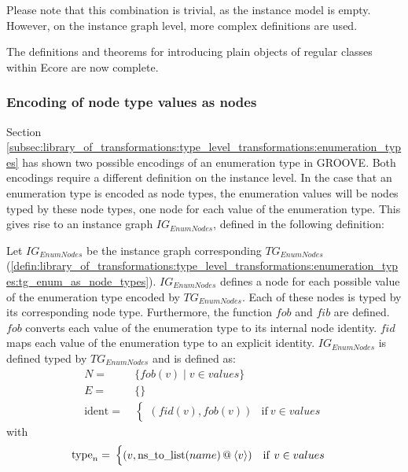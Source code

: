 Please note that this combination is trivial, as the instance model is empty. However, on the instance graph level, more complex definitions are used.

The definitions and theorems for introducing plain objects of regular classes within Ecore are now complete. 

\subsubsection{Encoding of node type values as nodes}

Section \cref{subsec:library_of_transformations:type_level_transformations:enumeration_types} has shown two possible encodings of an enumeration type in GROOVE. Both encodings require a different definition on the instance level. In the case that an enumeration type is encoded as node types, the enumeration values will be nodes typed by these node types, one node for each value of the enumeration type. This gives rise to an instance graph $IG_{EnumNodes}$, defined in the following definition:

\begin{defin}
\label{defin:library_of_transformations:instance_level_transformations:enumeration_values:ig_enum_as_node_types}
Let $IG_{EnumNodes}$ be the instance graph corresponding $TG_{EnumNodes}$ (\cref{defin:library_of_transformations:type_level_transformations:enumeration_types:tg_enum_as_node_types}). $IG_{EnumNodes}$ defines a node for each possible value of the enumeration type encoded by $TG_{EnumNodes}$. Each of these nodes is typed by its corresponding node type. Furthermore, the function $fob$ and $fib$ are defined. $fob$ converts each value of the enumeration type to its internal node identity. $fid$ maps each value of the enumeration type to an explicit identity. $IG_{EnumNodes}$ is defined typed by $TG_{EnumNodes}$ and is defined as:
\begin{align*}
N =\ & \{fob(v) \mid v \in values \} \\
E =\ & \{\} \\
\mathrm{ident} =\ & \begin{cases}
    (fid(v), fob(v)) & \mathrm{if }\ v \in values
\end{cases}
\end{align*}
with
\begin{align*}
\mathrm{type}_n =\ & \begin{cases}
    (v, \mathrm{ns\_\!to\_\!list}(name) \operatorname{@\:} \langle v \rangle) & \mathrm{if }\ v \in values
\end{cases}
\end{align*}
\end{defin}

